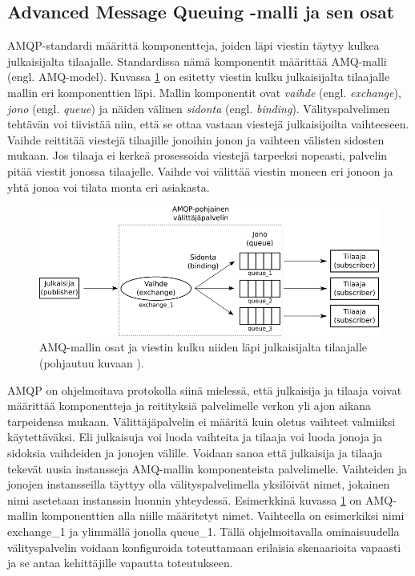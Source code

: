 \subsection{Advanced Message Queuing -malli ja sen osat}
AMQP-standardi määrittä komponentteja, joiden läpi viestin täytyy kulkea julkaisijalta tilaajalle. Standardissa nämä komponentit määrittää AMQ-malli (engl. AMQ-model). Kuvassa \ref{fig:amq-model-parts} on esitetty viestin kulku julkaisijalta tilaajalle mallin eri  komponenttien läpi. Mallin komponentit ovat \emph{vaihde} (engl. \emph{exchange}), \emph{jono} (engl. \emph{queue}) ja näiden välinen \emph{sidonta} (engl. \emph{binding}). Välityspalvelimen tehtävän voi tiivistää niin, että se ottaa vastaan viestejä julkaisijoilta vaihteeseen. Vaihde reittitää viestejä tilaajille jonoihin jonon ja vaihteen välisten sidosten mukaan. Jos tilaaja ei kerkeä prosessoida viestejä tarpeeksi nopeasti, palvelin pitää viestit jonossa tilaajelle. Vaihde voi välittää viestin moneen eri jonoon ja yhtä jonoa voi tilata monta eri asiakasta.

\begin{figure}[ht!]
	\includegraphics[width=1\textwidth]{pictures/amq-model-parts.png}
	\caption{AMQ-mallin osat ja viestin kulku niiden läpi julkaisijalta tilaajalle (pohjautuu kuvaan \cite[s.~11]{AMQP-specification}).}
	\label{fig:amq-model-parts}
\end{figure}

AMQP on ohjelmoitava protokolla siinä mielessä, että julkaisija ja tilaaja voivat määrittää komponentteja ja reitityksiä palvelimelle verkon yli ajon aikana tarpeidensa mukaan. Välittäjäpalvelin ei määritä kuin oletus vaihteet valmiiksi käytettäväksi. Eli julkaisuja voi luoda vaihteita ja tilaaja voi luoda jonoja ja sidoksia vaihdeiden ja jonojen välille. Voidaan sanoa että julkaisija ja tilaaja tekevät uusia instansseja AMQ-mallin komponenteista palvelimelle. Vaihteiden ja jonojen instansseilla täyttyy olla välityspalvelimella yksilöivät nimet, jokainen nimi asetetaan instanssin luonnin yhteydessä. Esimerkkinä kuvassa \ref{fig:amq-model-parts} on AMQ-mallin komponenttien alla niille määritetyt nimet. Vaihteella on esimerkiksi nimi exchange\_1 ja ylimmällä jonolla queue\_1. Tällä ohjelmoitavalla ominaisuudella välityspalvelin voidaan konfiguroida toteuttamaan erilaisia skenaarioita vapaasti ja se antaa kehittäjille vapautta toteutukseen.



